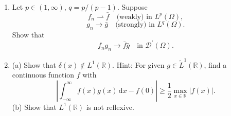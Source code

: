 \begin{enumerate}[label=\thesection.\arabic*.,ref=\thesection.\arabic*,start=24,series=book-problems]
\item\label{ex:weak-strong-holder-dual-product-distribution-limit} Let $p\in(1,\infty)$, $q=p/(p-1)$. Suppose\[f_n\rightharpoonup\bar f\quad\text{(weakly) in }L^p(\Omega),\]\[g_n\to\bar g\quad\text{(strongly) in }L^q(\Omega).\]Show that\[f_ng_n\to\bar f\bar g\quad\text{in }\mathcal{D}^{\prime}(\Omega).\]

\item\label{ex:dirac-not-l-one-and-l-one-nonreflexivity} (a) Show that $\delta(x)\notin L^1(\mathbb{R})$. Hint: For given $g\in\widetilde L^1(\mathbb{R})$, find a continuous function $f$ with
\begin{equation}\label{eq:dirac-not-l-one-continuous-test-separation}
\left|\int_{-\infty}^{\infty}f(x)g(x)\,\mathrm{d}x-f(0)\right|\geq\dfrac{1}{2}\max_{x\in\mathbb{R}}|f(x)|.
\end{equation}
(b) Show that $L^1(\mathbb{R})$ is not reflexive.

\end{enumerate}
